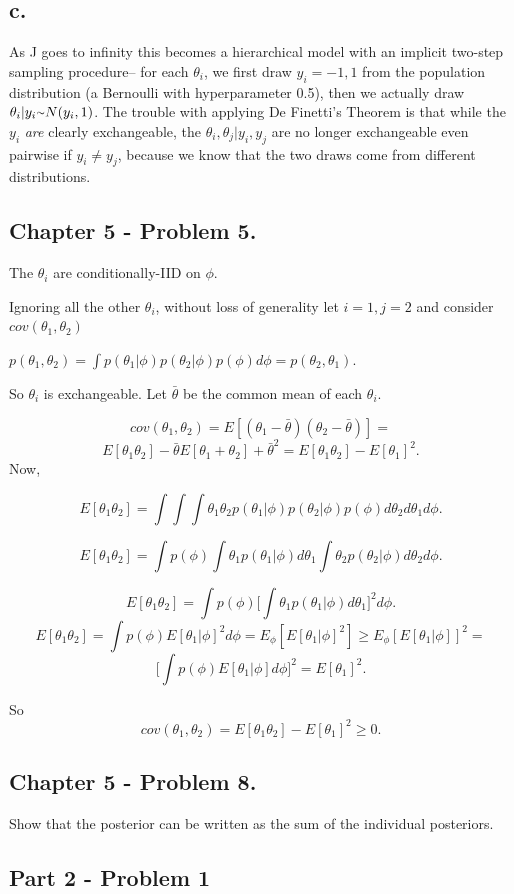 \documentclass{article}
\newcommand{\mytilde}{\raise.17ex\hbox{$\scriptstyle\mathtt{\sim}$}}
\begin{document}
\subsection{c.}

As J goes to infinity this becomes a hierarchical model with an implicit two-step sampling procedure--
for each \(\theta_i\), we first draw \(y_i = -1,1\) from the population distribution (a Bernoulli with hyperparameter 0.5), then
we actually draw \(\theta_i \vert y_i \mytilde N(y_i, 1)\). The trouble with applying De Finetti's Theorem
is that while the \(y_i\) \textit{are} clearly exchangeable, the \(\theta_i, \theta_j \vert y_i, y_j\) are no longer exchangeable 
even pairwise if \(y_i \neq y_j\), because we know that the two draws come from different distributions.

\subsection{Chapter 5 - Problem 5.}

The \(\theta_i\) are conditionally-IID on \(\phi\). 

Ignoring all the other \(\theta_i\), without loss of generality
let \(i = 1, j = 2\) and consider \(cov(\theta_1, \theta_2)\)

\(p(\theta_1, \theta_2) = \int p(\theta_1 \vert \phi) p(\theta_2 \vert \phi) p(\phi) d\phi = p(\theta_2, \theta_1)\).

So \(\theta_i\) is exchangeable. Let \(\bar{\theta}\) be the common mean of each \(\theta_i\).

\[cov(\theta_1, \theta_2) = E[(\theta_1 - \bar{\theta})(\theta_2 - \bar{\theta})] = \]
\[E[\theta_1\theta_2] - \bar{\theta}E[\theta_1 + \theta_2] + \bar{\theta}^2 = 
E[\theta_1\theta_2] - E[\theta_1]^2.\] Now,

\[E[\theta_1\theta_2]  = \int \int \int \theta_1 \theta_2 p(\theta_1 \vert \phi) p(\theta_2 \vert \phi) p(\phi)  d\theta_2 d\theta_1 d\phi. \]

\[E[\theta_1\theta_2]  = \int  p(\phi) \int \theta_1 p(\theta_1 \vert \phi)d \theta_1  \int \theta_2 p(\theta_2 \vert \phi) d\theta_2 d\phi. \]

\[E[\theta_1\theta_2]  = \int  p(\phi) \bigg[ \int \theta_1 p(\theta_1 \vert \phi) d\theta_1\bigg]^2  d\phi.\]
\[E[\theta_1\theta_2]  = \int  p(\phi) E[\theta_1 \vert \phi]^2  d\phi 
= E_{\phi} [E[\theta_1 \vert \phi]^2] \geq E_{\phi}[E[\theta_1 \vert \phi]]^2 = \]
\[\big[ \int  p(\phi) E[\theta_1 \vert \phi] d\phi\big]^2 = E[\theta_1]^2.\]

So \[cov(\theta_1, \theta_2) = E[\theta_1\theta_2] - E[\theta_1]^2 \geq 0.\]




\subsection{Chapter 5 - Problem 8.}


Show that the posterior can be written as the sum of the individual posteriors.

\subsection{Part 2 - Problem 1}
\end{document}
